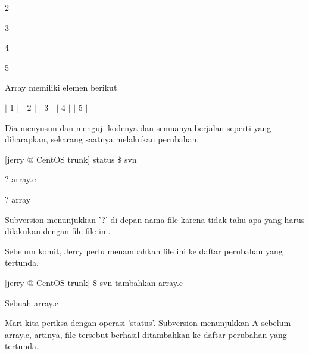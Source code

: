 \noindent 
 \hspace*{0.5in}  \hspace*{0.5in} 2 \par
\noindent 
 \hspace*{0.5in}  \hspace*{0.5in} 3 \par
\noindent 
 \hspace*{0.5in}  \hspace*{0.5in} 4 \par
\noindent 
 \hspace*{0.5in}  \hspace*{0.5in} 5 \par
\noindent 
 \hspace*{0.5in} Array memiliki elemen berikut \par
\noindent 
 \hspace*{0.5in}  \hspace*{0.5in}  $  \vert  $ 1  $  \vert  $  $  \vert  $ 2  $  \vert  $  $  \vert  $ 3  $  \vert  $  $  \vert  $ 4  $  \vert  $  $  \vert  $ 5  $  \vert  $ \par
\vspace{12pt}
\vspace{12pt}
\vspace{12pt}
\vspace{12pt}
\noindent 
Dia menyusun dan menguji kodenya dan semuanya berjalan seperti yang diharapkan, sekarang saatnya melakukan perubahan. \par
\noindent 
 \hspace*{0.5in} [jerry @ CentOS trunk] status  $  \$  $ svn \par
\noindent 
 \hspace*{0.5in} ? array.c \par
\noindent 
 \hspace*{0.5in} ? array \par
\noindent 
Subversion menunjukkan '?' di depan nama file karena tidak tahu apa yang harus dilakukan dengan file-file ini. \par
\noindent 
Sebelum komit, Jerry perlu menambahkan file ini ke daftar perubahan yang tertunda. \par
\noindent 
 \hspace*{0.5in} [jerry @ CentOS trunk]  $  \$  $ svn tambahkan array.c \par
\noindent 
 \hspace*{0.5in} Sebuah array.c \par
\noindent 
Mari kita periksa dengan operasi 'status'. Subversion menunjukkan A sebelum array.c, artinya, file tersebut berhasil ditambahkan ke daftar perubahan yang tertunda. \par
